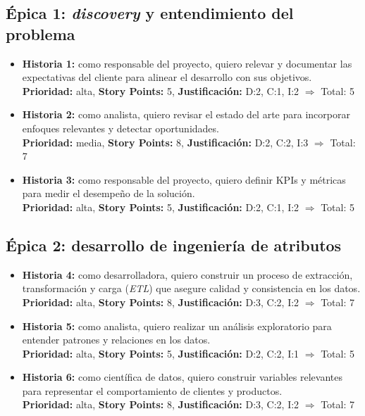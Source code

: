 \documentclass[
11pt, %
]{charter}
\begin{document}
\subsection*{\'Epica 1: \textit{discovery} y entendimiento del problema}
\begin{itemize}
  \item \textbf{Historia 1:} como responsable del proyecto, quiero relevar y documentar las expectativas del cliente para alinear el desarrollo con sus objetivos.\\
  \textbf{Prioridad:} alta, \textbf{Story Points:} 5, \textbf{Justificación:} D:2, C:1, I:2 $\Rightarrow$ Total: 5

  \item \textbf{Historia 2:} como analista, quiero revisar el estado del arte para incorporar enfoques relevantes y detectar oportunidades.\\
  \textbf{Prioridad:} media, \textbf{Story Points:} 8, \textbf{Justificación:} D:2, C:2, I:3 $\Rightarrow$ Total: 7

  \item \textbf{Historia 3:} como responsable del proyecto, quiero definir KPIs y métricas para medir el desempeño de la solución.\\
  \textbf{Prioridad:} alta, \textbf{Story Points:} 5, \textbf{Justificación:} D:2, C:1, I:2 $\Rightarrow$ Total: 5
\end{itemize}

\subsection*{\'Epica 2: desarrollo de ingeniería de atributos}
\begin{itemize}
  \item \textbf{Historia 4:} como desarrolladora, quiero construir un proceso de extracción, transformación y carga (\textit{ETL}) que asegure calidad y consistencia en los datos.\\
  \textbf{Prioridad:} alta, \textbf{Story Points:} 8, \textbf{Justificación:} D:3, C:2, I:2 $\Rightarrow$ Total: 7

  \item \textbf{Historia 5:} como analista, quiero realizar un análisis exploratorio para entender patrones y relaciones en los datos.\\
  \textbf{Prioridad:} alta, \textbf{Story Points:} 5, \textbf{Justificación:} D:2, C:2, I:1 $\Rightarrow$ Total: 5

  \item \textbf{Historia 6:} como científica de datos, quiero construir variables relevantes para representar el comportamiento de clientes y productos.\\
  \textbf{Prioridad:} alta, \textbf{Story Points:} 8, \textbf{Justificación:} D:3, C:2, I:2 $\Rightarrow$ Total: 7
\end{itemize}
\end{document}
